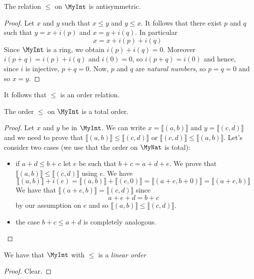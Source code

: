 \begin{lemma}
    \label{MyInt.le_antisymm}
    \leanok
    The relation $\leq$ on $\MyInt$ is antisymmetric.
\end{lemma}
\begin{proof}
    \leanok
    Let $x$ and $y$ such that $x \leq y$ and $y \leq x$. It follows that there exist $p$ and $q$
    such that $y = x + i(p)$ and $x = y + i(q)$. In particular
    \[
    x = x + i(p) + i(q)
    \]
    Since $\MyInt$ is a ring, we obtain $i(p)+i(q) = 0$. Moreover $i(p+q)=i(p)+i(q)$ and $i(0)=0$, so
    $i(p+q)=i(0)$ and hence, since $i$ is injective, $p+q = 0$. Now, $p$ and $q$ are \emph{natural numbers}, so $p=q=0$ and so $x=y$.
\end{proof}

It follows that $\leq$ is an order relation.

\begin{lemma}
    \label{MyInt.le_total}
    \leanok
    The order $\leq$ on $\MyInt$ is a total order.
\end{lemma}
\begin{proof}
    \leanok
    Let $x$ and $y$ be in $\MyInt$. We can write $x = ⟦ (a,b) ⟧$ and
    $y = ⟦ (c,d) ⟧$ and we need to prove that
    $⟦ (a,b) ⟧ \leq ⟦ (c,d) ⟧$ or $⟦ (c,d) ⟧ \leq ⟦ (a,b) ⟧$. Let's consider two cases (we use that the order on $\MyNat$ is total):
    \begin{itemize}
        \item if $a + d \leq b + c$ let $e$ be such that $b + c = a + d + e$. We prove that
        $⟦ (a,b) ⟧ \leq ⟦ (c,d) ⟧$ using $e$. We have
        \[
        ⟦ (a,b) ⟧+i(e) = ⟦ (a,b) ⟧ + ⟦ (e,0) ⟧
        = ⟦ (a+e,b+0) ⟧ = ⟦ (a+e,b) ⟧
        \]
        We have that $⟦ (a+e,b) ⟧ = ⟦ (c,d) ⟧$ since
        \[
        a+e+d=b+c
        \]
        by our assumption on $e$ and so $⟦ (a,b) ⟧ \leq ⟦ (c,d) ⟧$.
        \item the case $b + c \leq a + d$ is completely analogous.
    \end{itemize}
\end{proof}

\begin{lemma}
    \label{MyInt.linearOrder}
    \leanok
    We have that $\MyInt$ with $\leq$ is a \emph{linear order}
\end{lemma}
\begin{proof}
    \leanok
    Clear.
\end{proof}

